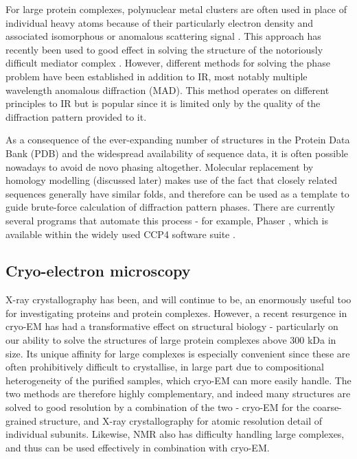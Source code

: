 \documentclass[a4paper,11pt,twoside,openright]{scrbook}
\begin{document}
For large protein complexes, polynuclear metal clusters are often used in place
of individual heavy atoms because of their particularly electron density and
associated isomorphous or anomalous scattering signal \cite{Dauter2005}. This
approach has recently been used to good effect in solving the structure of the
notoriously difficult mediator complex \cite{Nozawa2017}. However, different
methods for solving the phase problem have been established in addition to IR,
most notably multiple wavelength anomalous diffraction \cite{Hendrickson1991}
(MAD). This method operates on different principles to IR but is popular since
it is limited only by the quality of the diffraction pattern provided to it.

As a consequence of the ever-expanding number of structures in the Protein Data
Bank \cite{Berman2000} (PDB) and the widespread availability of sequence data,
it is often possible nowadays to avoid de novo phasing altogether. Molecular
replacement by homology modelling (discussed later) makes use of the fact that
closely related sequences generally have similar folds, and therefore can be
used as a template to guide brute-force calculation of diffraction pattern
phases. There are currently several programs that automate this process - for
example, Phaser \cite{McCoy2007}, which is available within the widely used CCP4
software suite \cite{Winn2011}.

\subsection{Cryo-electron microscopy}
X-ray crystallography has been, and will continue to be, an enormously useful
too for investigating proteins and protein complexes. However, a recent
resurgence in cryo-EM has had a transformative effect on structural biology -
particularly on our ability to solve the structures of large protein complexes
above 300 kDa in size. Its unique affinity for large complexes is especially
convenient since these are often prohibitively difficult to crystallise, in
large part due to compositional heterogeneity of the purified samples, which
cryo-EM can more easily handle. The two methods are therefore highly
complementary, and indeed many structures are solved to good resolution by a
combination of the two - cryo-EM for the coarse-grained structure, and X-ray
crystallography for atomic resolution detail of individual subunits. Likewise,
NMR also has difficulty handling large complexes, and thus can be used
effectively in combination with cryo-EM.
\end{document}
